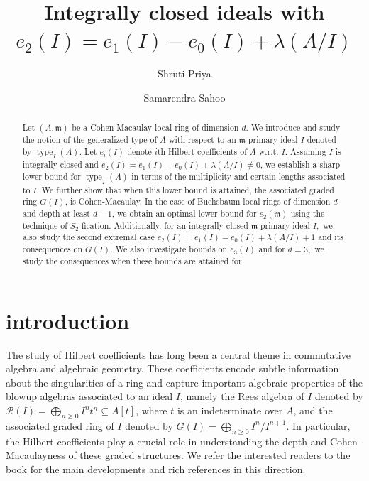 \documentclass[11pt]{amsart}
\theoremstyle{plain}
\newcommand{\m}{\mathfrak{m}}
\theoremstyle{plain}
\begin{document}
\title{Integrally closed ideals with $e_{2}(I)=e_{1}(I)-e_{0}(I)+\lambda(A/I)$}
\author{Shruti Priya}
\address{ Indian Institute of Technology Kharagpur, Kharagpur 721302, West Bengal, India} 
\author{Samarendra Sahoo}
\address{ Indian Institute of Technology Dharwad, Dharwad 580011, Karnataka, India}



\begin{abstract} 
Let $(A,\mathfrak{m})$ be a Cohen-Macaulay local ring of dimension $d.$ We introduce and study the notion of the generalized type of $A$ with respect to an $\mathfrak{m}$-primary ideal $I$ denoted by $\operatorname{type}_I(A).$ Let $e_i(I)$ denote $i$th Hilbert coefficients of $A$ w.r.t. $I$. Assuming $I$ is integrally closed and $e_{2}(I)=e_{1}(I)-e_{0}(I)+\lambda(A/I) \neq 0$, we establish a sharp lower bound for $\operatorname{type}_I(A)$ in terms of the multiplicity and certain lengths associated to $I.$  We further show that when this lower bound is attained, the associated graded ring  $G(I)$, is Cohen-Macaulay.  In the case of Buchsbaum local rings of dimension $d$ and depth at least $d-1$, we obtain an optimal lower bound for $e_{2}(\m)$ using the technique of $S_{2}$-fication.  Additionally, for an integrally closed $\mathfrak{m}$-primary ideal $I,$ we  also study the second extremal case  $e_{2}(I)=e_{1}(I)-e_{0}(I)+\lambda(A/I)+1$ and its  consequences on $G(I).$ We also investigate bounds on $e_3(I)$ and for $d=3,$ we  study the consequences when these bounds are attained for. 



 
 
 

\end{abstract}

\maketitle



\section{introduction} 
The study of Hilbert coefficients has long been a central theme in commutative algebra and algebraic geometry. These coefficients encode subtle information about the singularities of a ring and capture important algebraic properties of the blowup algebras associated to an ideal $I$, namely the Rees algebra of $I$ denoted by $\mathcal{R}(I)=\displaystyle \bigoplus_{n \geq 0}I^{n}t^{n}\subseteq A[t]$, where $t$ is an indeterminate over $A$, and 
the associated graded ring of $I$ denoted by $G(I)=\displaystyle \bigoplus_{n \geq 0}I^{n}/I^{n+1}$. In particular, the Hilbert coefficients play a crucial role in understanding the depth and Cohen-Macaulayness of these graded structures. We
refer the interested readers to the book \cite{rossi2010hilbert} for the 
main developments and rich references in this direction. 
\end{document}
